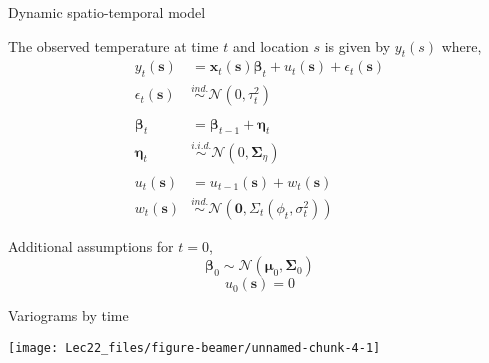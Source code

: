 \documentclass[11pt,ignorenonframetext,]{beamer}
\begin{document}
\begin{frame}{Dynamic spatio-temporal model}
\protect\hypertarget{dynamic-spatio-temporal-model}{}

\vspace{2mm}

The observed temperature at time \(t\) and location \(s\) is given by
\(y_t(s)\) where, \footnotesize \[
\begin{aligned}
y_t(\symbf{s}) & = \symbf{x}_t(\symbf{s})\symbf{\beta}_t + u_t(\symbf{s}) + \epsilon_t(\symbf{s}) \\
\epsilon_t(\symbf{s}) &\stackrel{ind.}\sim \mathcal{N}(0,\tau_{t}^2) \\
\\
\symbf{\beta}_t & = \symbf{\beta}_{t-1} + \symbf{\eta}_t \\
\symbf{\eta}_t &\stackrel{i.i.d.}\sim \mathcal{N}(0,\symbf{\Sigma}_{\eta}) \\
\\
u_t(\symbf{s}) &= u_{t-1}(\symbf{s}) + w_t(\symbf{s}) \\
w_t(\symbf{s}) &\stackrel{ind.}{\sim} \mathcal{N}\left(\symbf{0}, \Sigma_t(\phi_t, \sigma^2_t)\right)
\end{aligned}
\]

\vspace{3mm}

\pause

\normalsize

Additional assumptions for \(t=0\), \footnotesize \[
\symbf{\beta}_{0} \sim \mathcal{N}(\symbf{\mu}_0, \symbf{\Sigma}_0)
\] \[
u_{0}(\symbf{s}) = 0
\]

\end{frame}

\begin{frame}{Variograms by time}
\protect\hypertarget{variograms-by-time}{}

\begin{center}\texttt{[image: Lec22\_files/figure-beamer/unnamed-chunk-4-1]} \end{center}

\end{frame}
\end{document}
